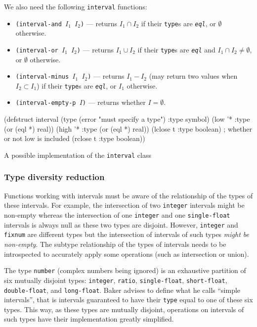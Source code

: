 \documentclass[format=sigconf]{acmart}
\newcommand\code[2][\small]{\sloppy\texttt{#1#2}}
\theoremstyle{definition}
\begin{document}
We also need the following \code{interval} functions:
\begin{itemize}
\item \code{(interval-and $I_1$ $I_2$)} --- returns $I_1 \cap I_2$ if their
  \code{type}s are \emph{\code{eql}}, or $\emptyset$ otherwise.
\item \code{(interval-or $I_1$ $I_2$)} --- returns $I_1 \cup I_2$ if their
  \code{type}s are \emph{\code{eql}} and $I_1 \cap I_2 \not= \emptyset$, or $\emptyset$ otherwise.
\item \code{(interval-minus $I_1$ $I_2$)} --- returns $I_1 - I_2$ (may return
  two values when $I_2 \subset I_1$) if their \code{type}s are \emph{\code{eql}},
  or $I_1$ otherwise.
\item \code{(interval-empty-p $I$)} --- returns whether $I = \emptyset$.
\end{itemize}

\begin{listing}
\begin{clcode}
(defstruct interval
  (type (error "must specify a type") :type symbol)
  (low '* :type (or (eql *) real))
  (high '* :type (or (eql *) real))
  (lclose t :type boolean) ; whether or not low is included
  (rclose t :type boolean))
\end{clcode}
\caption{A possible implementation of the \code{interval} class}
\label{lst:interval}
\end{listing}

\subsubsection{Type diversity reduction}
\label{sec:tdred}
Functions working with intervals must be aware of the relationship of the types
of these intervals. For example, the intersection of two \code{integer}
intervals might be non-empty whereas the intersection of one \code{integer} and
one \code{single-float} intervals is always null as these two types are disjoint.
However, \code{integer} and \code{fixnum} are different types but the
intersection of intervals of such types \emph{might be non-empty}.
The subtype relationship of the types of intervals needs to be introspected to
accurately apply some operations (such as intersection or union).

The type \code{number} (complex numbers being ignored) is an exhaustive
partition of six mutually disjoint types: \code{integer}, \code{ratio},
\code{single-float}, \code{short-float}, \code{double-float}, and
\code{long-float}.
Baker advises to define what he calls ``simple intervals'', that is intervals
guaranteed to have their \code{type} equal to one of these six types. This way,
as these types are mutually disjoint, operations on intervals of such types have
their implementation greatly simplified.
\end{document}
